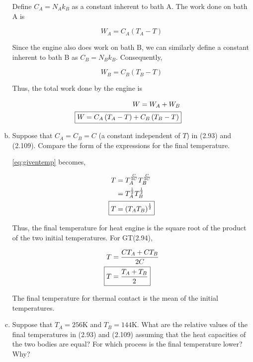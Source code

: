 \documentclass[9pt,a4paper,twocolumn]{article}
\begin{document}
\begin{enumerate}[(a)]
Define $C_A = N_A k_B$ as a constant inherent to bath A. The work done on bath A is

\begin{equation}
	W_A = C_A \left( T_A - T \right)
\end{equation}

Since the engine also does work on bath B, we can similarly define a constant inherent to bath B as $C_B = N_B k_B$. Consequently, 

\begin{equation}
	W_B = C_B \left( T_B - T \right)
\end{equation}

Thus, the total work done by the engine is

\begin{eqnarray}
	W = W_A + W_B \\
	\Aboxed{ W = C_A \left( T_A - T \right) + C_B \left( T_B - T \right) } \label{eq:answer-a}
\end{eqnarray}

\item Suppose that $C_A = C_B = C$ (a constant independent of $T$) in (2.93) and (2.109). Compare the form of the expressions for the final temperature.

\eqref{eq:giventemp} becomes,

\begin{align}
	T &= T_A^{\frac{C}{2C}} T_B^{\frac{C}{2C}} \nonumber \\
	& = T_A^\frac{1}{2} T_B^{\frac{1}{2}} \nonumber \\
	\Aboxed{ T &= \left( T_A T_B \right)^{\frac{1}{2}} } \label{eq:answer-b-engine}
\end{align}

Thus, the final temperature for heat engine is the square root of the product of the two initial temperatures. For GT(2.94),

\begin{align}
	T &= \frac{CT_A + CT_B}{2C} \nonumber \\
	\Aboxed{ T &= \frac{T_A + T_B}{2} } \label{eq:answer-b-contact}
\end{align}

The final temperature for thermal contact is the mean of the initial temperatures.

\item Suppose that $T_A = 256$K and $T_B = 144$K. What are the relative values of the final temperatures in (2.93) and (2.109) assuming that the heat capacities of the two bodies are equal? For which process is the final temperature lower? Why?


\end{enumerate}
\end{document}
